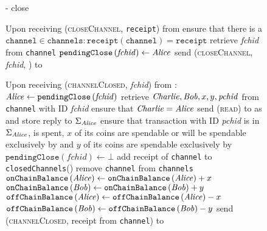   \begin{figure}[H]
    \begin{systembox}{\fpaynet - close}
      \begin{algorithmic}[1]
        \State Upon receiving (\textsc{closeChannel}, \texttt{receipt}) from
        \alice
        \Indent
          \State ensure that there is a $\mathtt{channel} \in \mathtt{channels}
          : \mathtt{receipt}\left(\mathtt{channel}\right) = \mathtt{receipt}$
          \State retrieve \textit{fchid} from \texttt{channel}
          \State $\mathtt{pendingClose}\left(\mathit{fchid}\right) \gets \mathit{Alice}$
          \State send (\textsc{closeChannel}, \textit{fchid}, \alice) to
          \simulator
        \EndIndent
        \Statex

        \State Upon receiving (\textsc{channelClosed}, \textit{fchid}) from
        \simulator:
        \Indent
          \State $\mathit{Alice} \gets \mathtt{pendingClose}\left(\mathit{fchid}\right)$
          \State retrieve $\mathit{Charlie}, \mathit{Bob}, x, y, \mathit{pchid}$ from
          \texttt{channel} with ID \textit{fchid}
          \State ensure that $\mathit{Charlie}{} = \mathit{Alice}$
          \State send (\textsc{read}) to \ledger{} as \alice{} and store reply
          to $\Sigma_{\mathit{Alice}}$
          \State ensure that transaction with ID \textit{pchid} is in
          $\Sigma_{\mathit{Alice}}$, is spent, $x$ of its coins are spendable or
          will be spendable exclusively by \alice{} and $y$ of its coins are
          spendable exclusively by \bob
          \State $\mathtt{pendingClose}\left(\mathit{fchid}\right) \gets \bot$
          \State add receipt of \texttt{channel} to
          \texttt{closedChannels}(\bob)
          \State remove \texttt{channel} from \texttt{channels}
          \State $\mathtt{onChainBalance}\left(\mathit{Alice}\right) \gets
          \mathtt{onChainBalance}\left(\mathit{Alice}\right) + x$
          \State $\mathtt{onChainBalance}\left(\mathit{Bob}\right) \gets
          \mathtt{onChainBalance}\left(\mathit{Bob}\right) + y$
          \State $\mathtt{offChainBalance}\left(\mathit{Alice}\right) \gets
          \mathtt{offChainBalance}\left(\mathit{Alice}\right) - x$
          \State $\mathtt{offChainBalance}\left(\mathit{Bob}\right) \gets
          \mathtt{offChainBalance}\left(\mathit{Bob}\right) - y$
          \State send (\textsc{channelClosed}, receipt from \texttt{channel}) to
          \alice
        \EndIndent
      \end{algorithmic}
    \end{systembox}
    \caption{}
    \label{alg:fpaynet:close}
  \end{figure}

